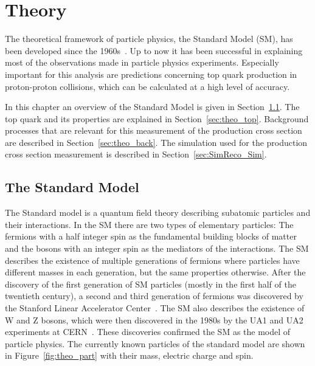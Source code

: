 
\chapter{Theory}
\label{sec:theo}

The theoretical framework of particle physics, the Standard Model (SM), has been developed since the 1960s~\cite{GellMann:1961ky,Weinberg:1967tq}.
Up to now it has been successful in explaining most of the observations made in particle physics experiments. 
Especially important for this analysis are predictions concerning top quark production in 
proton-proton collisions, which can be calculated at a high level of accuracy.

In this chapter an overview of the Standard Model is given in Section~\ref{sec:theo_sm}. 
The top quark and its properties are explained in Section~\ref{sec:theo_top}.
Background processes that are relevant for this measurement of the \ttbar production cross section are described in Section~\ref{sec:theo_back}.
The simulation used for the \ttbar production cross section measurement is described in Section~\ref{sec:SimReco_Sim}.


\section{The Standard Model}
\label{sec:theo_sm}

The Standard model is a quantum field theory describing subatomic particles and their interactions.
In the SM there are two types of elementary particles: The fermions with a half integer spin as the fundamental building blocks of matter and 
the bosons with an integer spin as the mediators of the interactions.
The SM describes the existence of multiple generations of fermions where particles have different masses in each generation, but the same properties otherwise.
After the discovery of the first generation of SM particles (mostly in the first half of the twentieth century), a second and third generation of fermions was discovered by the Stanford Linear Accelerator Center~\cite{PhysRevLett.23.935,PhysRevLett.23.930}.
The SM also describes the existence of W and Z bosons, which were then discovered in the 1980s by the UA1 and UA2 experiments at CERN~\cite{ARNISON1983103,1983398,BANNER1983476,BAGNAIA1983130}.
These discoveries confirmed the SM as the model of particle physics.
The currently known particles of the standard model are shown in Figure~\ref{fig:theo_part} with their mass, electric charge and spin.

